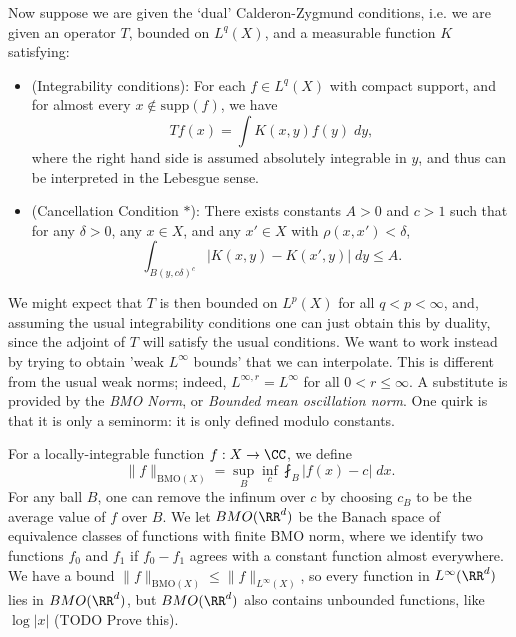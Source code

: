 Now suppose we are given the `dual' Calderon-Zygmund conditions, i.e. we are given an operator $T$, bounded on $L^q(X)$, and a measurable function $K$ satisfying:
%
\begin{itemize}
    \item (Integrability conditions): For each $f \in L^q(X)$ with compact support, and for almost every $x \not \in \text{supp}(f)$, we have
    \[ Tf(x) = \int K(x,y) f(y)\; dy, \]
    where the right hand side is assumed absolutely integrable in $y$, and thus can be interpreted in the Lebesgue sense.

    \item (Cancellation Condition $*$): There exists constants $A > 0$ and $c > 1$ such that for any $\delta > 0$, any $x \in X$, and any $x' \in X$ with $\rho(x,x') < \delta$,
    \[ \int_{B(y,c\delta)^c} |K(x,y) - K(x',y)|\; dy \leq A. \]
\end{itemize}
%
We might expect that $T$ is then bounded on $L^p(X)$ for all $q < p < \infty$, and, assuming the usual integrability conditions one can just obtain this by duality, since the adjoint of $T$ will satisfy the usual conditions. We want to work instead by trying to obtain 'weak $L^\infty$ bounds' that we can interpolate. This is different from the usual weak norms; indeed, $L^{\infty,r} = L^\infty$ for all $0 < r \leq \infty$. A substitute is provided by the \emph{BMO Norm}, or \emph{Bounded mean oscillation norm}. One quirk is that it is only a seminorm: it is only defined modulo constants.

For a locally-integrable function $f: X \to \CC$, we define
%
\[ \| f \|_{\text{BMO}(X)} = \sup_B \inf_c \fint_B | f(x) - c |\; dx. \]
%
For any ball $B$, one can remove the infinum over $c$ by choosing $c_B$ to be the average value of $f$ over $B$. We let $BMO(\RR^d)$ be the Banach space of equivalence classes of functions with finite BMO norm, where we identify two functions $f_0$ and $f_1$ if $f_0 - f_1$ agrees with a constant function almost everywhere. We have a bound $\| f \|_{\text{BMO}(X)} \leq \| f \|_{L^\infty(X)}$, so every function in $L^\infty(\RR^d)$ lies in $BMO(\RR^d)$, but $BMO(\RR^d)$ also contains unbounded functions, like $\log |x|$ (TODO Prove this).

